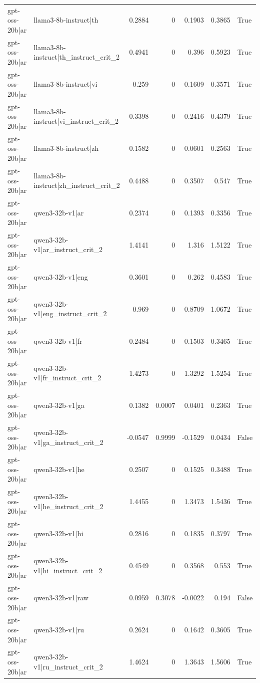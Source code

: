 \begin{table}
\begin{tabular}{l l r r r r l}
gpt-oss-20b|ar & llama3-8b-instruct|th & 0.2884 & 0 & 0.1903 & 0.3865 & True \\
gpt-oss-20b|ar & llama3-8b-instruct|th_instruct_crit_2 & 0.4941 & 0 & 0.396 & 0.5923 & True \\
gpt-oss-20b|ar & llama3-8b-instruct|vi & 0.259 & 0 & 0.1609 & 0.3571 & True \\
gpt-oss-20b|ar & llama3-8b-instruct|vi_instruct_crit_2 & 0.3398 & 0 & 0.2416 & 0.4379 & True \\
gpt-oss-20b|ar & llama3-8b-instruct|zh & 0.1582 & 0 & 0.0601 & 0.2563 & True \\
gpt-oss-20b|ar & llama3-8b-instruct|zh_instruct_crit_2 & 0.4488 & 0 & 0.3507 & 0.547 & True \\
gpt-oss-20b|ar & qwen3-32b-v1|ar & 0.2374 & 0 & 0.1393 & 0.3356 & True \\
gpt-oss-20b|ar & qwen3-32b-v1|ar_instruct_crit_2 & 1.4141 & 0 & 1.316 & 1.5122 & True \\
gpt-oss-20b|ar & qwen3-32b-v1|eng & 0.3601 & 0 & 0.262 & 0.4583 & True \\
gpt-oss-20b|ar & qwen3-32b-v1|eng_instruct_crit_2 & 0.969 & 0 & 0.8709 & 1.0672 & True \\
gpt-oss-20b|ar & qwen3-32b-v1|fr & 0.2484 & 0 & 0.1503 & 0.3465 & True \\
gpt-oss-20b|ar & qwen3-32b-v1|fr_instruct_crit_2 & 1.4273 & 0 & 1.3292 & 1.5254 & True \\
gpt-oss-20b|ar & qwen3-32b-v1|ga & 0.1382 & 0.0007 & 0.0401 & 0.2363 & True \\
gpt-oss-20b|ar & qwen3-32b-v1|ga_instruct_crit_2 & -0.0547 & 0.9999 & -0.1529 & 0.0434 & False \\
gpt-oss-20b|ar & qwen3-32b-v1|he & 0.2507 & 0 & 0.1525 & 0.3488 & True \\
gpt-oss-20b|ar & qwen3-32b-v1|he_instruct_crit_2 & 1.4455 & 0 & 1.3473 & 1.5436 & True \\
gpt-oss-20b|ar & qwen3-32b-v1|hi & 0.2816 & 0 & 0.1835 & 0.3797 & True \\
gpt-oss-20b|ar & qwen3-32b-v1|hi_instruct_crit_2 & 0.4549 & 0 & 0.3568 & 0.553 & True \\
gpt-oss-20b|ar & qwen3-32b-v1|raw & 0.0959 & 0.3078 & -0.0022 & 0.194 & False \\
gpt-oss-20b|ar & qwen3-32b-v1|ru & 0.2624 & 0 & 0.1642 & 0.3605 & True \\
gpt-oss-20b|ar & qwen3-32b-v1|ru_instruct_crit_2 & 1.4624 & 0 & 1.3643 & 1.5606 & True \\

\end{tabular}
\end{table}
